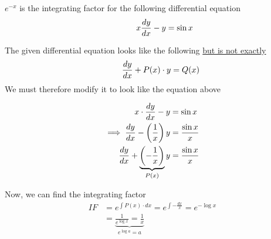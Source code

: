 \documentclass[14pt,fleqn]{extarticle}
\begin{document}
 
\begin{snippet}
    
    \incorrect
    
    $e^{-x}$ is the integrating factor for the following differential equation 
    \[ \quad \qquad x\frac{dy}{dx} - y = \sin x \]
    
    \reason
    
    The given differential equation looks like the following \underline{but is not exactly}
    \[ \qquad \frac{dy}{dx} + P(x)\cdot y = Q(x) \]
	We must therefore modify it to 
    look like the equation above 
    
    \begin{align}
	x\cdot\frac{dy}{dx} - y &= \sin x \\
	\implies \frac{dy}{dx} - \left(\frac{1}{x} \right)y &= \frac{\sin x}{x} \\
	\frac{dy}{dx} + \underbrace{\left(-\frac{1}{x} \right)}_{P(x)} y &= \frac{\sin x}{x} 
\end{align}

Now, we can find the integrating factor
\begin{align}
	IF &= e^{\int P(x)\cdot dx} = e^{\int -\frac{dx}{x}} = e^{-\log x} \\
	&= \underbrace{\frac{1}{e^{\log x}} = \frac{1}{x} }_{e^{\log a } = a}
\end{align}
    
\end{snippet} 
\end{document}
